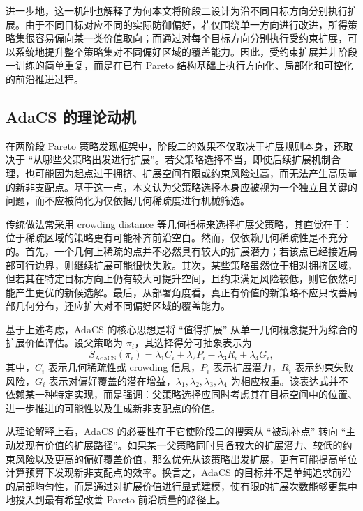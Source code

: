 \documentclass[12pt,a4paper]{article}
\begin{document}
进一步地，这一机制也解释了为何本文将阶段二设计为沿不同目标方向分别执行扩展。由于不同目标对应不同的实际防御偏好，若仅围绕单一方向进行改进，所得策略集很容易偏向某一类价值取向；而通过对每个目标方向分别执行受约束扩展，可以系统地提升整个策略集对不同偏好区域的覆盖能力。因此，受约束扩展并非阶段一训练的简单重复，而是在已有 Pareto 结构基础上执行方向化、局部化和可控化的前沿推进过程。

\subsection{AdaCS 的理论动机}

在两阶段 Pareto 策略发现框架中，阶段二的效果不仅取决于扩展规则本身，还取决于 ``从哪些父策略出发进行扩展''。若父策略选择不当，即使后续扩展机制合理，也可能因为起点过于拥挤、扩展空间有限或约束风险过高，而无法产生高质量的新非支配点。基于这一点，本文认为父策略选择本身应被视为一个独立且关键的问题，而不应被简化为仅依据几何稀疏度进行机械筛选。

传统做法常采用 crowding distance 等几何指标来选择扩展父策略，其直觉在于：位于稀疏区域的策略更有可能补齐前沿空白。然而，仅依赖几何稀疏性是不充分的。首先，一个几何上稀疏的点并不必然具有较大的扩展潜力；若该点已经接近局部可行边界，则继续扩展可能很快失败。其次，某些策略虽然位于相对拥挤区域，但若其在特定目标方向上仍有较大可提升空间，且约束满足风险较低，则它依然可能产生更优的新候选解。最后，从部署角度看，真正有价值的新策略不应只改善局部几何分布，还应扩大对不同偏好区域的覆盖能力。

基于上述考虑，AdaCS 的核心思想是将 ``值得扩展'' 从单一几何概念提升为综合的扩展价值评估。设父策略为 $\pi_i$，其选择得分可抽象表示为
\begin{equation}
S_{\mathrm{AdaCS}}(\pi_i)
=
\lambda_1 C_i
+
\lambda_2 P_i
-
\lambda_3 R_i
+
\lambda_4 G_i,
\end{equation}
其中，$C_i$ 表示几何稀疏性或 crowding 信息，$P_i$ 表示扩展潜力，$R_i$ 表示约束失败风险，$G_i$ 表示对偏好覆盖的潜在增益，$\lambda_1,\lambda_2,\lambda_3,\lambda_4$ 为相应权重。该表达式并不依赖某一种特定实现，而是强调：父策略选择应同时考虑其在目标空间中的位置、进一步推进的可能性以及生成新非支配点的价值。

从理论解释上看，AdaCS 的必要性在于它使阶段二的搜索从 ``被动补点'' 转向 ``主动发现有价值的扩展路径''。如果某一父策略同时具备较大的扩展潜力、较低的约束风险以及更高的偏好覆盖价值，那么优先从该策略出发扩展，更有可能提高单位计算预算下发现新非支配点的效率。换言之，AdaCS 的目标并不是单纯追求前沿的局部均匀性，而是通过对扩展价值进行显式建模，使有限的扩展次数能够更集中地投入到最有希望改善 Pareto 前沿质量的路径上。
\end{document}
